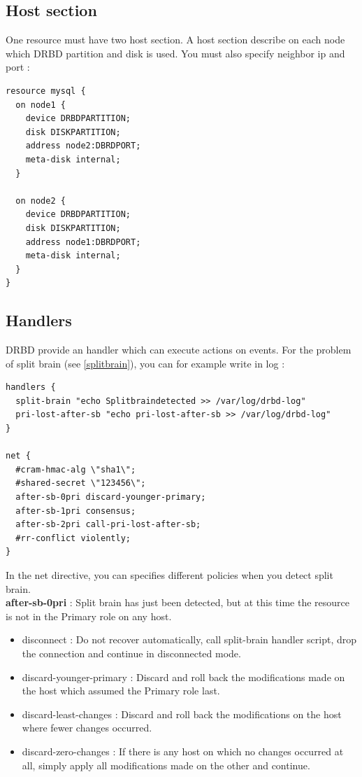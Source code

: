 \documentclass[a4paper,10pt]{report}
\begin{document}
\subsection{Host section}
\label{hostsection} 
One resource must have two host section. A host section describe on each node which DRBD partition and disk is used. You must also specify neighbor ip and port :
\begin{lstlisting}
resource mysql {
  on node1 {
    device DRBDPARTITION;
    disk DISKPARTITION;
    address node2:DBRDPORT;
    meta-disk internal;
  }

  on node2 {
    device DRBDPARTITION;
    disk DISKPARTITION;
    address node1:DBRDPORT;
    meta-disk internal;
  }
}
\end{lstlisting}

\subsection{Handlers}
DRBD provide an handler which can execute actions on events. For the problem of split brain (see \ref{splitbrain}), you can for example write in log :
\begin{lstlisting}
handlers {
  split-brain "echo Splitbraindetected >> /var/log/drbd-log"
  pri-lost-after-sb "echo pri-lost-after-sb >> /var/log/drbd-log"
}

net {
  #cram-hmac-alg \"sha1\";
  #shared-secret \"123456\";
  after-sb-0pri discard-younger-primary;
  after-sb-1pri consensus;
  after-sb-2pri call-pri-lost-after-sb;
  #rr-conflict violently;
}
\end{lstlisting}
In the net directive, you can specifies different policies when you detect split brain.\\
\textbf{after-sb-0pri} : Split brain has just been detected, but at this time the resource is not in the Primary role on any host.
\begin{itemize}
\item disconnect : Do not recover automatically, call split-brain handler script, drop the connection and continue in disconnected mode.
\item discard-younger-primary : Discard and roll back the modifications made on the host which assumed the Primary role last.
\item discard-least-changes : Discard and roll back the modifications on the host where fewer changes occurred.
\item discard-zero-changes : If there is any host on which no changes occurred at all, simply apply all modifications made on the other and continue.
\end{itemize}
\end{document}
